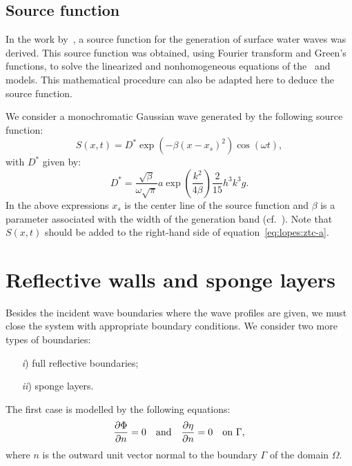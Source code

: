 \subsection{Source function}
In the work by~\cite{WeiKirbySinha1999}, a source
function for the generation of
surface water waves was derived.  This source function was
obtained, using Fourier transform and Green's functions, to
solve the linearized and nonhomogeneous equations of
the~\cite{Peregrine1967} and~\cite{Nwogu1993} models.  This
mathematical procedure can also be adapted here to deduce
the source function.

We consider a monochromatic Gaussian wave generated by the
following source function:
\begin{equation}\label{eq:lopes:src}
S(x,t)=D^* \exp(-\beta (x-x_s)^2)\cos(\omega t),
\end{equation}
with $D^*$ given by:
\begin{equation}
\displaystyle
D^*=\frac{\sqrt{\beta}}{\omega\sqrt{\pi}}a\exp(\frac{k^2}{4\beta})\frac{2}{15}h^3k^3g.
\end{equation}
In the above expressions $x_s$ is the center line of the
source function and $\beta$ is a parameter associated with
the width of the generation band
(cf.~\cite{WeiKirbySinha1999}).  Note that $S(x,t)$ should
be added to the right-hand side of
equation~\eqref{eq:lopes:ztc-a}.

\section{Reflective walls and sponge layers}\label{sec:lopes:boundaryconditions}

Besides the incident wave boundaries where the wave profiles
are given, we must close the system with appropriate
boundary conditions.  We consider two more types of
boundaries:
\begin{itemize}
\item[{\it i})] full reflective boundaries;
\item[{\it ii})] sponge layers.
\end{itemize}
The first case is modelled by the following equations:
\begin{equation}\label{eq:lopes:fullrefl}
\frac{\partial \Phi}{\partial n}=0\quad {\rm
  and}\quad\frac{\partial \eta}{\partial n}=0\quad {\rm
  on\,\, } \Gamma,
\end{equation}
where $n$ is the outward unit vector normal to the boundary
$\Gamma$ of the domain $\Omega$.


